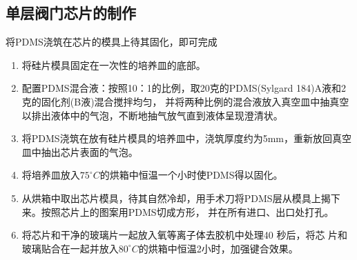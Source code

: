 \subsection{单层阀门芯片的制作}
	将PDMS浇筑在芯片的模具上待其固化，即可完成
	\begin{enumerate}[label={\alph*)},font={\color{black!50!black}\bfseries}]
	\item 将硅片模具固定在一次性的培养皿的底部。
	\item 配置PDMS混合液：按照10：1的比例，取20克的PDMS(Sylgard 184)A液和2克的固化剂(B液)混合搅拌均匀，
	并将两种比例的混合液放入真空皿中抽真空以排出液体中的气泡，不断地抽气放气直到液体呈现澄清状。
	\item 将PDMS浇筑在放有硅片模具的培养皿中，浇筑厚度约为5mm，重新放回真空皿中抽出芯片表面的气泡。
	\item 将培养皿放入$75^\circ C$的烘箱中恒温一个小时使PDMS得以固化。
	\item 从烘箱中取出芯片模具，待其自然冷却，用手术刀将PDMS层从模具上揭下来。按照芯片上的图案用PDMS切成方形，
	并在所有进口、出口处打孔。
	\item 将芯片和干净的玻璃片一起放入氧等离子体去胶机中处理40 秒后，将芯
片和玻璃贴合在一起并放入$80^\circ C$的烘箱中恒温2小时，加强键合效果。
	\end{enumerate}
